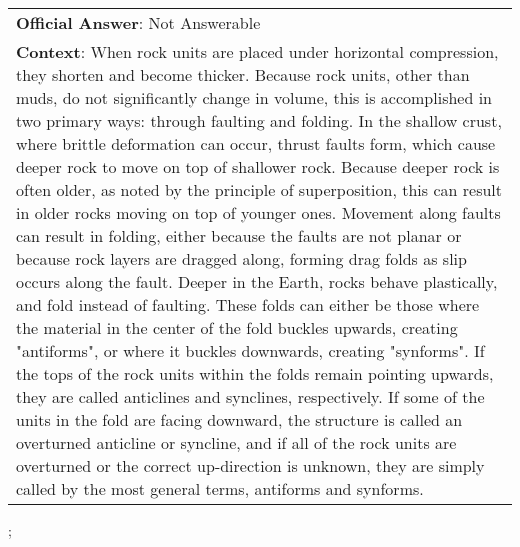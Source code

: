 \begin{figure*}[ht]
{\begin{tabular}{p{}}
            \textbf{Official Answer}: Not Answerable                                                                                                                                                                                                                                                                                                                                                                                                                                                                                                                                                                                                                                                                                                                                                                                                                                                                                                                                                                                                                                                                                                                                                                                                                                                                                                                                                                        \\
            \textbf{Context}: When rock units are placed under horizontal compression, they shorten and become thicker. Because rock units, other than muds, do not significantly change in volume, this is accomplished in two primary ways: through faulting and folding. In the shallow crust, where brittle deformation can occur, thrust faults form, which cause deeper rock to move on top of shallower rock. Because deeper rock is often older, as noted by the principle of superposition, this can result in older rocks moving on top of younger ones. Movement along faults can result in folding, either because the faults are not planar or because rock layers are dragged along, forming drag folds as slip occurs along the fault. Deeper in the Earth, rocks behave plastically, and fold instead of faulting. These folds can either be those where the material in the center of the fold buckles upwards, creating "antiforms", or where it buckles downwards, creating "synforms". If the tops of the rock units within the folds remain pointing upwards, they are called anticlines and synclines, respectively. If some of the units in the fold are facing downward, the structure is called an overturned anticline or syncline, and if all of the rock units are overturned or the correct up-direction is unknown, they are simply called by the most general terms, antiforms and synforms. \\
        \end{tabular}
    };
    \label{fig:ex-5a5909b13e1742001a15cf4c}
\end{figure*}

